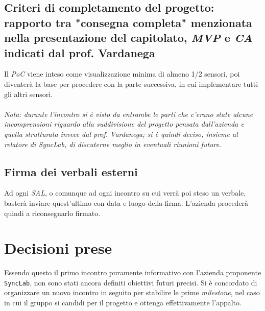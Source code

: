 \subsection{Criteri di completamento del progetto: rapporto tra "consegna completa" menzionata nella presentazione del capitolato, \textit{MVP} e \textit{CA} indicati dal prof. Vardanega}
Il \textit{PoC} viene inteso come visualizzazione minima di almeno 1/2 sensori, poi diventerà la base per procedere con la parte successiva, in cui implementare tutti gli altri sensori.\\\\
\emph{Nota: durante l'incontro si è visto da entrambe le parti che c'erano state alcune incomprensioni riguardo alla suddivisione del progetto pensata dall'azienda e quella strutturata invece dal prof. Vardanega; si è quindi deciso, insieme al relatore di SyncLab, di discuterne meglio in eventuali riunioni future}.

\subsection{Firma dei verbali esterni}
Ad ogni \textit{SAL}, o comunque ad ogni incontro su cui verrà poi steso un verbale, basterà inviare quest'ultimo con data e luogo della firma. L'azienda procederà quindi a riconsegnarlo firmato.

\section{Decisioni prese}
Essendo questo il primo incontro puramente informativo con l'azienda proponente \texttt{SyncLab}, non sono stati ancora definiti obiettivi futuri precisi. Si è concordato di organizzare un nuovo incontro in seguito per stabilire le prime \textit{milestone}, nel caso in cui il gruppo si candidi per il progetto e ottenga effettivamente l'appalto.\\\\



